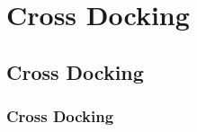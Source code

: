 \chapter{Cross Docking}
\label{chapter:cross_docking}
\section{Cross Docking}
\label{section:cross_docking}
\subsection{Cross Docking}
\label{subsection:cross_docking}
\cite{jacobson2004hierarchical}
